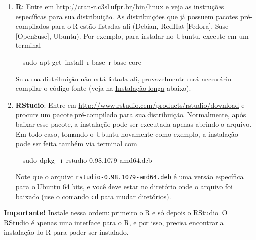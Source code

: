 \documentclass[a4paper,12pt]{article}\usepackage[]{graphicx}\usepackage[]{color}
\makeatletter
\newcommand{\hlnum}[1]{\textcolor[rgb]{0.686,0.059,0.569}{#1}}%
\newcommand{\hlopt}[1]{\textcolor[rgb]{0,0,0}{#1}}%
\newcommand{\hlstd}[1]{\textcolor[rgb]{0.345,0.345,0.345}{#1}}%
\newcommand{\hlkwc}[1]{\textcolor[rgb]{0.333,0.667,0.333}{#1}}%
\newenvironment{kframe}{%
 \def\at@end@of@kframe{}%
 \ifinner\ifhmode%
  \def\at@end@of@kframe{\end{minipage}}%
  \begin{minipage}{\columnwidth}%
 \fi\fi%
 \def\FrameCommand##1{\hskip\@totalleftmargin \hskip-\fboxsep
 \colorbox{shadecolor}{##1}\hskip-\fboxsep
     \hskip-\linewidth \hskip-\@totalleftmargin \hskip\columnwidth}%
 \MakeFramed {\advance\hsize-\width
   \@totalleftmargin\z@ \linewidth\hsize
   \@setminipage}}%
 {\par\unskip\endMakeFramed%
 \at@end@of@kframe}
\newenvironment{knitrout}{}{} %
\providecommand{\R}{\textsf{R}\xspace}
\providecommand{\RStudio}{\textsf{RStudio}\xspace}
\makeatother
\begin{document}
\begin{enumerate}
\item \textbf{\R}: Entre em \url{http://cran-r.c3sl.ufpr.br/bin/linux} e
  veja as instruções específicas para sua distribuição. As distribuições
  que já possuem pacotes pré-compilados para o \R estão listadas ali
  (Debian, RedHat [Fedora], Suse [OpenSuse], Ubuntu). Por exemplo, para
  instalar no Ubuntu, execute em um terminal
\begin{knitrout}\small
{}\color{fgcolor}\begin{kframe}
\noindent
\ttfamily
\hlstd{}\hlstd{\ \ }\hlstd{sudo\ apt}\hlopt{{-}}\hlstd{get\ }\hlkwc{install\ }\hlstd{r}\hlopt{{-}}\hlstd{base\ r}\hlopt{{-}}\hlstd{base}\hlopt{{-}}\hlstd{core}\hspace*{\fill}
\mbox{}
\normalfont
\normalsize
\end{kframe}
\end{knitrout}
  Se a sua distribuição não está listada ali, provavelmente será
  necessário compilar o código-fonte (veja na
  \hyperref[sec:ill]{Instalação longa} abaixo).
\item \textbf{\RStudio}: Entre em
  \url{http://www.rstudio.com/products/rstudio/download}
  e procure um pacote
  pré-compilado para sua distribuição. Normalmente, após baixar esse
  pacote, a instalação pode ser executada apenas abrindo o arquivo. Em
  todo caso, tomando o Ubuntu novamente como exemplo, a instalação pode
  ser feita também via terminal com
\begin{knitrout}\small
{}\color{fgcolor}\begin{kframe}
\noindent
\ttfamily
\hlstd{}\hlstd{\ \ }\hlstd{sudo\ dpkg\ }\hlopt{{-}}\hlstd{i\ rstudio}\hlopt{{-}}\hlstd{}\hlnum{0.98.1079}\hlstd{}\hlopt{{-}}\hlstd{amd64.deb}\hspace*{\fill}
\mbox{}
\normalfont
\normalsize
\end{kframe}
\end{knitrout}
  Note que o arquivo \texttt{rstudio-0.98.1079-amd64.deb} é uma versão
  específica para o Ubuntu 64 bits, e você deve estar no diretório onde
  o arquivo foi baixado (use o comando \texttt{cd} para mudar
  diretórios).

\end{enumerate}

\textbf{Importante!} Instale nessa ordem: primeiro o \R e só depois o
\RStudio. O \RStudio é apenas uma interface para o \R, e por isso,
precisa encontrar a instalação do \R para poder ser instalado.
\end{document}
